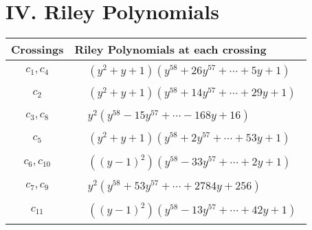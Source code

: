 \documentclass[1p]{elsarticle_modified}
\theoremstyle{definition}
\begin{document}
\centering \section*{ IV. Riley Polynomials}
\begin{tabular}{m{50pt}|m{274pt}}
Crossings & \hspace{64pt}Riley Polynomials at each crossing \\
\hline $$\begin{aligned}c_{1},c_{4}\end{aligned}$$&$\begin{aligned}
&(y^2+y+1)(y^{58}+26 y^{57}+\cdots+5 y+1)
\end{aligned}$\\
\hline $$\begin{aligned}c_{2}\end{aligned}$$&$\begin{aligned}
&(y^2+y+1)(y^{58}+14 y^{57}+\cdots+29 y+1)
\end{aligned}$\\
\hline $$\begin{aligned}c_{3},c_{8}\end{aligned}$$&$\begin{aligned}
&y^2(y^{58}-15 y^{57}+\cdots-168 y+16)
\end{aligned}$\\
\hline $$\begin{aligned}c_{5}\end{aligned}$$&$\begin{aligned}
&(y^2+y+1)(y^{58}+2 y^{57}+\cdots+53 y+1)
\end{aligned}$\\
\hline $$\begin{aligned}c_{6},c_{10}\end{aligned}$$&$\begin{aligned}
&((y-1)^2)(y^{58}-33 y^{57}+\cdots+2 y+1)
\end{aligned}$\\
\hline $$\begin{aligned}c_{7},c_{9}\end{aligned}$$&$\begin{aligned}
&y^2(y^{58}+53 y^{57}+\cdots+2784 y+256)
\end{aligned}$\\
\hline $$\begin{aligned}c_{11}\end{aligned}$$&$\begin{aligned}
&((y-1)^2)(y^{58}-13 y^{57}+\cdots+42 y+1)
\end{aligned}$\\
\hline
\end{tabular}
\vskip 2pc
\end{document}
